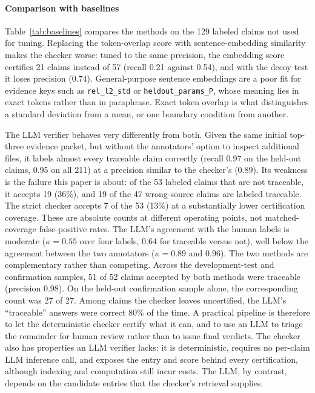 \documentclass[preprint,12pt,authoryear]{elsarticle}
\begin{document}
\paragraph{Comparison with baselines} Table~\ref{tab:baselines} compares the methods on the 129 labeled claims not used for tuning. Replacing the token-overlap score with sentence-embedding similarity makes the checker worse: tuned to the same precision, the embedding score certifies 21 claims instead of 57 (recall 0.21 against 0.54), and with the decoy test it loses precision (0.74). General-purpose sentence embeddings are a poor fit for evidence keys such as \texttt{rel\_l2\_std} or \texttt{heldout\_params\_P}, whose meaning lies in exact tokens rather than in paraphrase. Exact token overlap is what distinguishes a standard deviation from a mean, or one boundary condition from another.

The LLM verifier behaves very differently from both. Given the same initial top-three evidence packet, but without the annotators' option to inspect additional files, it labels almost every traceable claim correctly (recall 0.97 on the held-out claims, 0.95 on all 211) at a precision similar to the checker's (0.89). Its weakness is the failure this paper is about: of the 53 labeled claims that are not traceable, it accepts 19 (36\%), and 19 of the 47 wrong-source claims are labeled traceable. The strict checker accepts 7 of the 53 (13\%) at a substantially lower certification coverage. These are absolute counts at different operating points, not matched-coverage false-positive rates. The LLM's agreement with the human labels is moderate ($\kappa=0.55$ over four labels, $0.64$ for traceable versus not), well below the agreement between the two annotators ($\kappa=0.89$ and $0.96$). The two methods are complementary rather than competing. Across the development-test and confirmation samples, 51 of 52 claims accepted by both methods were traceable (precision 0.98). On the held-out confirmation sample alone, the corresponding count was 27 of 27. Among claims the checker leaves uncertified, the LLM's ``traceable'' answers were correct 80\% of the time. A practical pipeline is therefore to let the deterministic checker certify what it can, and to use an LLM to triage the remainder for human review rather than to issue final verdicts. The checker also has properties an LLM verifier lacks: it is deterministic, requires no per-claim LLM inference call, and exposes the entry and score behind every certification, although indexing and computation still incur costs. The LLM, by contrast, depends on the candidate entries that the checker's retrieval supplies.
\end{document}
